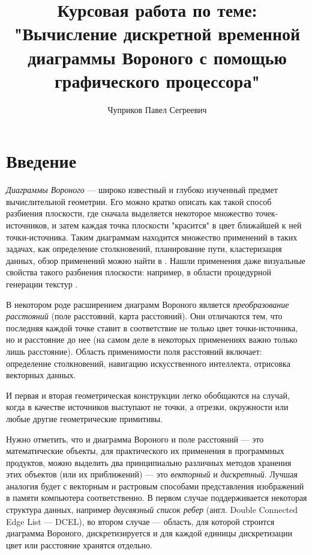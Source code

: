 \documentclass[12pt]{article}
\author{Чуприков Павел Сегреевич}
\title{Курсовая работа по теме: "Вычисление дискретной временной диаграммы Вороного с помощью графического процессора"}
\begin{document}
\begin{titlepage}
\maketitle
\end{titlepage}

\tableofcontents

\pagebreak

\section{Введение}
\emph{Диаграммы Вороного} --- широко известный и глубоко изученный предмет вычислительной геометрии. Его можно кратко описать как такой способ разбиения плоскости, где сначала выделяется некоторое множество точек-источников, и затем каждая точка плоскости "красится" в цвет ближайшей к ней точки-источника. Таким диаграммам находится множество применений в таких задачах, как определение столкновений, планирование пути, кластеризация данных, обзор применений 
можно найти в \cite{survey}. Нашли применения даже визуальные свойства такого разбиения плоскости: например, в области процедурной генерации текстур \cite{proced}. 

В некотором роде расширением диаграмм Вороного является \emph{преобразование расстояний} (поле расстояний, карта расстояний). Они отличаются тем, что последняя каждой точке ставит в соответствие не только цвет точки-источника, но и расстояние до нее (на самом деле в некоторых применениях важно только лишь расстояние). Область применимости поля расстояний включает: определение столкновений, навигацию искусственного интеллекта, отрисовка векторных данных. 

И первая и вторая геометрическая конструкции легко обобщаются на случай, когда в качестве источников выступают не точки, а отрезки, окружности или любые другие геометрические примитивы. 

Нужно отметить, что и диаграмма Вороного и поле расстояний --- это математические объекты, для практического их применения в программных продуктов, можно выделить два принципиально различных методов хранения этих объектов (или их приближений) --- это \emph{векторный} и \emph{дискретный}. Лучшая аналогия будет с векторным и растровым способами представления изображений в памяти компьютера соответственно. В первом случае поддерживается некоторая структура данных, например \emph{двусвязный список ребер} (англ. Double Connected Edge List --- DCEL), во втором случае --- область, для которой строится диаграмма Вороного, дискретизируется и для каждой единицы дискретизации цвет или расстояние хранятся отдельно.
\end{document}
